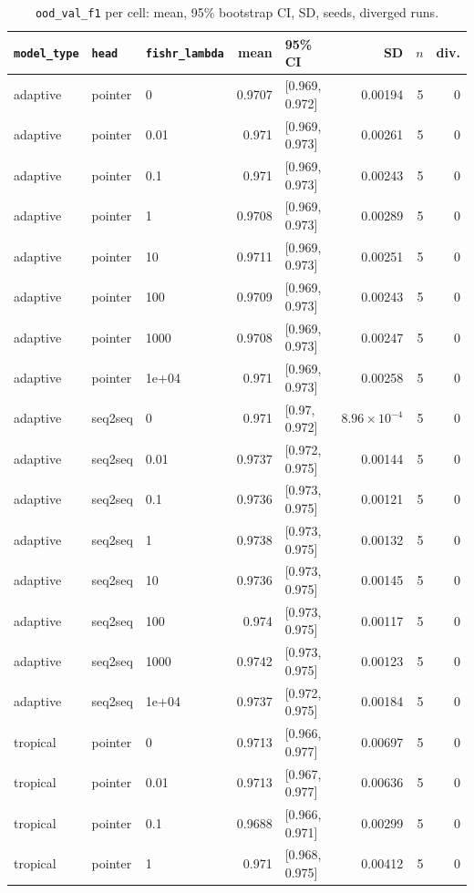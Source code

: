 \documentclass[10pt]{article}
\begin{document}
{\small
\begin{longtable}{lllrlrrr}
\caption{\texttt{ood\_val\_f1} per cell: mean, 95\% bootstrap CI, SD, seeds, diverged runs.}\label{tab:summary-ood_val_f1}\\
\toprule
\texttt{model\_type} & \texttt{head} & \texttt{fishr\_lambda} & mean & 95\% CI & SD & $n$ & div.\\
\midrule
\endhead
adaptive & pointer & 0 & 0.9707 & [0.969, 0.972] & 0.00194 & 5 & 0\\
adaptive & pointer & 0.01 & 0.971 & [0.969, 0.973] & 0.00261 & 5 & 0\\
adaptive & pointer & 0.1 & 0.971 & [0.969, 0.973] & 0.00243 & 5 & 0\\
adaptive & pointer & 1 & 0.9708 & [0.969, 0.973] & 0.00289 & 5 & 0\\
adaptive & pointer & 10 & 0.9711 & [0.969, 0.973] & 0.00251 & 5 & 0\\
adaptive & pointer & 100 & 0.9709 & [0.969, 0.973] & 0.00243 & 5 & 0\\
adaptive & pointer & 1000 & 0.9708 & [0.969, 0.973] & 0.00247 & 5 & 0\\
adaptive & pointer & 1e+04 & 0.971 & [0.969, 0.973] & 0.00258 & 5 & 0\\
adaptive & seq2seq & 0 & 0.971 & [0.97, 0.972] & $8.96\times10^{-4}$ & 5 & 0\\
adaptive & seq2seq & 0.01 & 0.9737 & [0.972, 0.975] & 0.00144 & 5 & 0\\
adaptive & seq2seq & 0.1 & 0.9736 & [0.973, 0.975] & 0.00121 & 5 & 0\\
adaptive & seq2seq & 1 & 0.9738 & [0.973, 0.975] & 0.00132 & 5 & 0\\
adaptive & seq2seq & 10 & 0.9736 & [0.973, 0.975] & 0.00145 & 5 & 0\\
adaptive & seq2seq & 100 & 0.974 & [0.973, 0.975] & 0.00117 & 5 & 0\\
adaptive & seq2seq & 1000 & 0.9742 & [0.973, 0.975] & 0.00123 & 5 & 0\\
adaptive & seq2seq & 1e+04 & 0.9737 & [0.972, 0.975] & 0.00184 & 5 & 0\\
tropical & pointer & 0 & 0.9713 & [0.966, 0.977] & 0.00697 & 5 & 0\\
tropical & pointer & 0.01 & 0.9713 & [0.967, 0.977] & 0.00636 & 5 & 0\\
tropical & pointer & 0.1 & 0.9688 & [0.966, 0.971] & 0.00299 & 5 & 0\\
tropical & pointer & 1 & 0.971 & [0.968, 0.975] & 0.00412 & 5 & 0\\

\end{longtable}}
\end{document}
